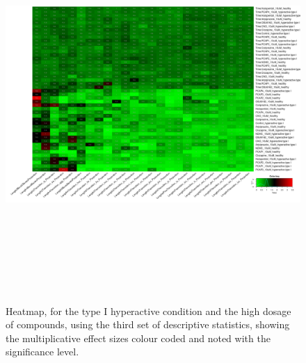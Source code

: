 \documentclass[a4paper,12pt]{article}
\begin{document}
\begin{figure}[h!]
\begin{center}
\includegraphics[width=16cm,height=15cm]{DarkApoHigh_heatmap_10_microM_DarkApoHigh_B1MAP.png}
\caption{Heatmap, for the type I hyperactive condition and the high dosage of compounds, using the third set of descriptive statistics, showing the multiplicative effect sizes colour coded and noted with the significance level.}
\end{center}
\end{figure}
\newpage
\end{document}
